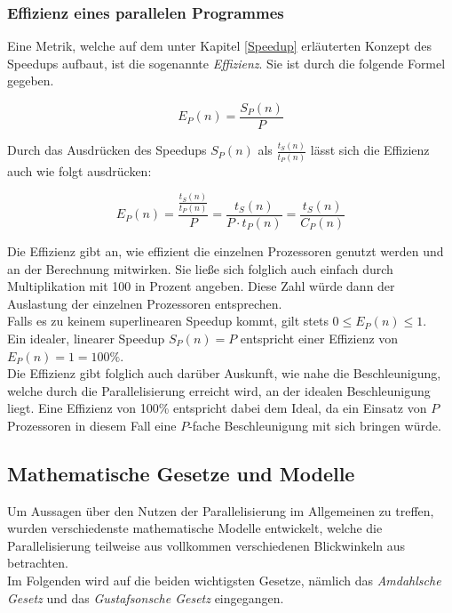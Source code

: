 			\subsubsection{Effizienz eines parallelen Programmes}
				\label{Effizienz}
			
				Eine Metrik, welche auf dem unter Kapitel \ref{Speedup} erläuterten Konzept des Speedups aufbaut, ist die sogenannte \textit{Effizienz}. Sie ist durch die folgende Formel gegeben.
				
				\[ E_P(n) = \frac{S_P(n)}{P} \]
				
				Durch das Ausdrücken des Speedups $S_P(n)$ als \( \frac{t_S(n)}{t_P(n)} \) lässt sich die Effizienz auch wie folgt ausdrücken:
				
				\[ E_P(n) = \frac{\frac{t_S(n)}{t_P(n)}}{P} = \frac{t_S(n)}{P \cdot t_P(n)} = \frac{t_S(n)}{C_P(n)} \]
				
				Die Effizienz gibt an, wie effizient die einzelnen Prozessoren genutzt werden und an der Berechnung mitwirken. Sie ließe sich folglich auch einfach durch Multiplikation mit 100 in Prozent angeben. Diese Zahl würde dann der Auslastung der einzelnen Prozessoren entsprechen.\\
				Falls es zu keinem superlinearen Speedup kommt, gilt stets \( 0 \leq E_P(n) \leq 1 \).\\
				Ein idealer, linearer Speedup $S_P(n) = P$ entspricht einer Effizienz von $E_P(n) = 1 = 100\%$.\\
				Die Effizienz gibt folglich auch darüber Auskunft, wie nahe die Beschleunigung, welche durch die Parallelisierung erreicht wird, an der idealen Beschleunigung liegt. Eine Effizienz von 100\% entspricht dabei dem Ideal, da ein Einsatz von $P$ Prozessoren in diesem Fall eine $P$-fache Beschleunigung mit sich bringen würde. \cite{ParaProgRauber}
			
		\subsection{Mathematische Gesetze und Modelle}
			
			Um Aussagen über den Nutzen der Parallelisierung im Allgemeinen zu treffen, wurden verschiedenste mathematische Modelle entwickelt, welche die Parallelisierung teilweise aus vollkommen verschiedenen Blickwinkeln aus betrachten.\\
			Im Folgenden wird auf die beiden wichtigsten Gesetze, nämlich das \textit{Amdahlsche Gesetz} und das \textit{Gustafsonsche Gesetz} eingegangen.
			
